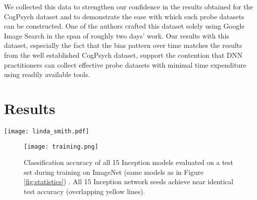 \documentclass{article}
\begin{document}
We collected this data to strengthen our confidence in the results obtained for the CogPsych dataset and to demonstrate the ease with which such probe datasets can be constructed. One of the authors crafted this dataset solely using Google Image Search in the span of roughly two days' work. Our results with this dataset, especially the fact that the bias pattern over time matches the results from the well established CogPsych dataset, support the contention that DNN practitioners can collect effective probe datasets with minimal time expenditure using readily available tools.

\section{Results}\begin{figure*}[ht]
\begin{center}
\centerline{\texttt{[image: linda\_smith.pdf]}}
\caption{Shape bias across models with different initialization seeds, and within models during training calculated using the CogPsyc dataset. (a) The shape bias $B_s$ of 15 Inception models is calculated throughout training (yellow lines). A strong shape bias emerges across all models. A bias value $B_s > 0.5$ indicates a shape bias and $B_s < 0.5$ indicates a colour bias. Two examples are highlighted here (blue and red lines) for clarity. (b) The shape bias fluctuates strongly within models during training by up to three standard deviations. (c) The distribution of bias values, calculated at the start (blue), middle (red) and end (yellow) of training. Bias variability is high at the start and end of training. Here, these distributions are calculated using kernel density estimates from all shape bias measurements from all models within the indicated window.
}
\label{fig:statistics}
\end{center}
\vskip -0.2in
\end{figure*}\begin{figure}[h]
\begin{center}
\centerline{\texttt{[image: training.png]}}
\caption{Classification accuracy of all 15 Inception models evaluated on a test set during training on ImageNet (same models as in Figure \ref{fig:statistics}) . All 15 Inception network seeds achieve near identical test accuracy (overlapping yellow lines).}
\label{fig:training}
\end{center}
\vskip -0.2in
\end{figure}\begin{figure}[h]

\end{figure}
\end{document}
